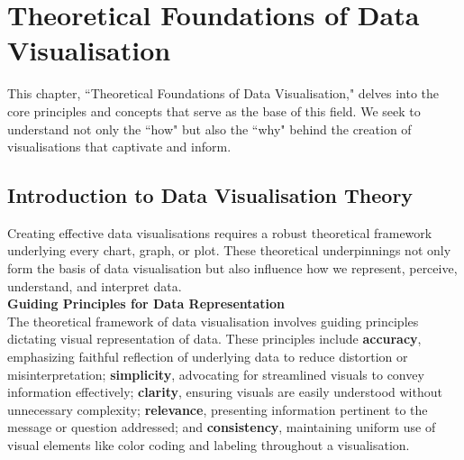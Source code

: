 \documentclass{article}\usepackage[]{graphicx}\usepackage[]{xcolor}
\begin{document}
\newpage 

\section{Theoretical Foundations of Data Visualisation}

This chapter, ``Theoretical Foundations of Data Visualisation," delves into the core principles and concepts that serve as the base of this field. We seek to understand not only the ``how" but also the ``why" behind the creation of visualisations that captivate and inform.

\subsection{Introduction to Data Visualisation Theory}

Creating effective data visualisations requires a robust theoretical framework underlying every chart, graph, or plot. These theoretical underpinnings not only form the basis of data visualisation but also influence how we represent, perceive, understand, and interpret data.\\ 

\noindent 
\textbf{Guiding Principles for Data Representation}\\

\noindent
The theoretical framework of data visualisation involves guiding principles dictating visual representation of data. These principles include \textbf{accuracy}, emphasizing faithful reflection of underlying data to reduce distortion or misinterpretation; \textbf{simplicity}, advocating for streamlined visuals to convey information effectively; \textbf{clarity}, ensuring visuals are easily understood without unnecessary complexity; \textbf{relevance}, presenting information pertinent to the message or question addressed; and \textbf{consistency}, maintaining uniform use of visual elements like color coding and labeling throughout a visualisation.
\end{document}
